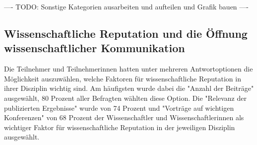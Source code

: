 ---- TODO: Sonstige Kategorien ausarbeiten und aufteilen und Grafik bauen  ----

\subsection{Wissenschaftliche Reputation und die Öffnung wissenschaftlicher Kommunikation}

Die Teilnehmer und Teilnehmerinnen hatten unter mehreren Antwortoptionen die Möglichkeit auszuwählen, welche Faktoren für wissenschaftliche Reputation in ihrer Disziplin wichtig sind. Am häufigsten wurde dabei die "Anzahl der Beiträge" ausgewählt, 80 Prozent aller Befragten wählten diese Option. Die "Relevanz der publizierten Ergebnisse" wurde von 74 Prozent und "Vorträge auf wichtigen Konferenzen" von 68 Prozent der Wissenschaftler und Wissenschaftlerinnen als wichtiger Faktor für wissenschaftliche Reputation in der jeweiligen Disziplin ausgewählt.

